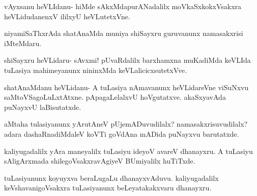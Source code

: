 \documentclass{article}
\begin{document}
\begin{mng}%
vAyxsanu heVLIdanu- hiMde sAkxMdapurANadalilx moVkaSxkokxVsakxra 
heVLidudanenxV ililxyU heVLutetxVne.
\end{mng}

\begin{mng}%
niyamiSaThxrAda shatAnaMda muniya shiSayxru guruvanunx namasakxrisi 
iMteMdaru.
\end{mng}

\begin{mng}%
shiSayxru heVLidaru- sAvxmi! pUvaRdalilx barxhamxna muKadiMda keVLIda 
tuLasiya mahimeyanunx nininxMda keVLalicicxsutetxVve.
\end{mng}

\begin{mng}%
shatAnaMdanu heVLidanu- A tuLasiya nAmavanunx heVLidareVne viSuNxvu 
saMtoVSagoLuLxtAtxne. pApagaLelalxvU hoVgutatxve. akaSxyavAda puNayxvU 
laBisutatxde.
\end{mng}

\begin{mng}%
aMtaha tulasiyanunx yArutAneV pUjemADuvudilalx? namasakxrisuvudilalx? 
adara dashaRnadiMdaleV koVTi goVdAna mADida puNayxvu barutatxde.
\end{mng}

\begin{mng}%
kaliyugadalilx yAra maneyalilx tuLasiyu ideyoV avareV dhanayxru. A 
tuLasiyu sAligArxmada shilegoVsakxravAgiyeV BUmiyalilx huTiTxde.
\end{mng}

\begin{mng}%
tuLasiyanunx koyuyxva beraLugaLu dhanayxvAduvu. kaliyugadalilx 
keVshavanigoVsakxra tuLasiyanunx beLeyatakakxvaru dhanayxru.
\end{mng}
\end{document}
